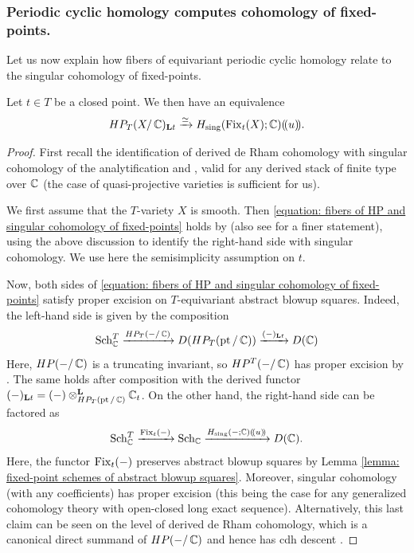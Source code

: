 \subsubsection{Periodic cyclic homology computes cohomology of fixed-points.}
Let us now explain how fibers of equivariant periodic cyclic homology relate to the singular cohomology of fixed-points.
\begin{proposition}\label{theorem: fibers of HP and cohomlogy of fixed points}
Let $t \in T$ be a closed point. We then have an equivalence
\begin{equation}\label{equation: fibers of HP and singular cohomology of fixed-points}
    HP_T(X/ \operatorname{\mathbb{C}})_{\mathbf{L} t} \xrightarrow{\simeq} H_{\mathrm{sing}}(\operatorname{Fix}_t(X); \operatorname{\mathbb{C}})(\!( u )\!).
\end{equation}
\end{proposition}
\begin{proof}
First recall the identification of derived de Rham cohomology with singular cohomology of the analytification \cite[Theorem 4.2.9 and Corollary 4.2.11]{Chen20} and \cite[Theorem 4.10]{Bha12}, valid for any derived stack of finite type over $\operatorname{\mathbb{C}}$ (the case of quasi-projective varieties is sufficient for us).

We first assume that the $T$-variety $X$ is smooth. Then \eqref{equation: fibers of HP and singular cohomology of fixed-points} holds by \cite[Corollary 1.0.4]{Chen20} (also see \cite[Theorem D]{Chen20} for a finer statement), using the above discussion to identify the right-hand side with singular cohomology. We use here the semisimplicity assumption on $t$.

Now, both sides of \eqref{equation: fibers of HP and singular cohomology of fixed-points} satisfy proper excision on $T$-equivariant abstract blowup squares.
Indeed, the left-hand side is given by the composition
\begin{equation*}
    \operatorname{Sch}^{T}_{\operatorname{\mathbb{C}}} \xrightarrow{HP_T(-/ \operatorname{\mathbb{C}})} D(HP_T(\operatorname{pt} / \operatorname{\mathbb{C}})) \xrightarrow{(-)_{\mathbf{L} t}} D(\operatorname{\mathbb{C}})
\end{equation*}
Here, $HP(-/\operatorname{\mathbb{C}})$ is a truncating invariant, so $HP^T(-/\operatorname{\mathbb{C}})$ has proper excision by \cite{ES21}. The same holds after composition with the derived functor $(-)_{\mathbf{L} t} = (-)\otimes^{\mathbf{L}}_{HP_T(\operatorname{pt} / \operatorname{\mathbb{C}})} \operatorname{\mathbb{C}}_t$.
On the other hand, the right-hand side can be factored as
\begin{equation*}
    \operatorname{Sch}^{T}_{\operatorname{\mathbb{C}}} \xrightarrow{\operatorname{Fix}_t(-)} \operatorname{Sch}_{\operatorname{\mathbb{C}}} \xrightarrow{H_{\mathrm{sing}}(-; \operatorname{\mathbb{C}})(\!( u )\!)} D(\operatorname{\mathbb{C}}).
\end{equation*}
Here, the functor $\operatorname{Fix}_t(-)$ preserves abstract blowup squares by Lemma \ref{lemma: fixed-point schemes of abstract blowup squares}. 
Moreover, singular cohomology (with any coefficients) has proper excision (this being the case for any generalized cohomology theory with open-closed long exact sequence). Alternatively, this last claim can be seen on the level of derived de Rham cohomology, which is a canonical direct summand of $HP(-/\operatorname{\mathbb{C}})$ and hence has cdh descent \cite[Lemma 4.5]{EM23}.


\end{proof}
